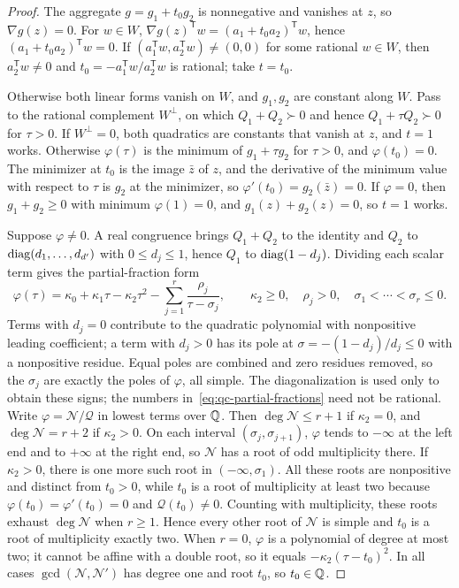 \begin{proof}
The aggregate $g=g_1+t_0g_2$ is nonnegative and vanishes at $z$, so
$\nabla g(z)=0$. For $w\in W$, $\nabla g(z)^{\mathsf T}w=(a_1+t_0a_2)^{\mathsf
T}w$, hence $(a_1+t_0a_2)^{\mathsf T}w=0$. If $(a_1^{\mathsf T}w,a_2^{\mathsf
T}w)\ne(0,0)$ for some rational $w\in W$, then $a_2^{\mathsf T}w\ne0$ and
$t_0=-a_1^{\mathsf T}w/a_2^{\mathsf T}w$ is rational; take $t=t_0$.

Otherwise both linear forms vanish on $W$, and $g_1,g_2$ are constant along
$W$. Pass to the rational complement $W^\perp$, on which $Q_1+Q_2\succ0$ and
hence $Q_1+\tau Q_2\succ0$ for $\tau>0$. If $W^\perp=0$, both quadratics are
constants that vanish at $z$, and $t=1$ works. Otherwise $\varphi(\tau)$ is
the minimum of $g_1+\tau g_2$ for $\tau>0$, and $\varphi(t_0)=0$. The minimizer
at $t_0$ is the image $\bar z$ of $z$, and the derivative of the minimum value
with respect to $\tau$ is $g_2$ at the minimizer, so $\varphi'(t_0)=g_2(\bar z)
=0$. If $\varphi=0$, then $g_1+g_2\ge0$ with minimum $\varphi(1)=0$, and
$g_1(z)+g_2(z)=0$, so $t=1$ works.

Suppose $\varphi\ne0$. A real congruence brings $Q_1+Q_2$ to the identity and
$Q_2$ to $\operatorname{diag}(d_1,\ldots,d_{d'})$ with $0\le d_j\le1$, hence $Q_1$ to
$\operatorname{diag}(1-d_j)$. Dividing each scalar term gives the partial-fraction form
\begin{equation}
\label{eq:qc-partial-fractions}
\varphi(\tau)=\kappa_0+\kappa_1\tau-\kappa_2\tau^2-\sum_{j=1}^r\frac{\rho_j}{\tau-\sigma_j},
\qquad \kappa_2\ge0,\quad\rho_j>0,\quad\sigma_1<\cdots<\sigma_r\le0 .
\end{equation}
Terms with $d_j=0$ contribute to the quadratic polynomial with nonpositive
leading coefficient; a term with $d_j>0$ has its pole at
$\sigma=-(1-d_j)/d_j\le0$ with a nonpositive residue. Equal poles are
combined and zero residues removed, so the $\sigma_j$ are exactly the poles of
$\varphi$, all simple. The diagonalization is used only to obtain these signs;
the numbers in~\eqref{eq:qc-partial-fractions} need not be rational. Write
$\varphi=\mathcal N/\mathcal Q$ in lowest terms over $\mathbb Q$. Then
$\deg\mathcal N\le r+1$ if $\kappa_2=0$, and $\deg\mathcal N=r+2$ if
$\kappa_2>0$. On each interval $(\sigma_j,\sigma_{j+1})$, $\varphi$ tends to
$-\infty$ at the left end and to $+\infty$ at the right end, so $\mathcal N$ has
a root of odd multiplicity there. If $\kappa_2>0$, there is one more such root
in $(-\infty,\sigma_1)$. All these roots are nonpositive and distinct from
$t_0>0$, while $t_0$ is a root of multiplicity at least two because
$\varphi(t_0)=\varphi'(t_0)=0$ and $\mathcal Q(t_0)\ne0$. Counting with
multiplicity, these roots exhaust $\deg\mathcal N$ when $r\ge1$. Hence every
other root of $\mathcal N$ is simple and $t_0$ is a root of multiplicity
exactly two. When $r=0$, $\varphi$ is a polynomial of degree at most two; it
cannot be affine with a double root, so it equals $-\kappa_2(\tau-t_0)^2$. In
all cases $\gcd(\mathcal N,\mathcal N')$ has degree one and root $t_0$, so
$t_0\in\mathbb Q$.


\end{proof}

